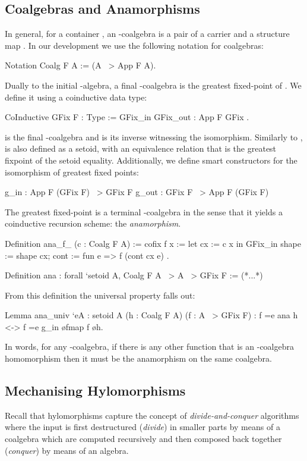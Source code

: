 \documentclass[a4paper,UKenglish,cleveref, autoref, thm-restate]{lipics-v2021}
\begin{document}
\subsection{Coalgebras and Anamorphisms}
\label{sec:coq-coalg}

In general, for a container , an -coalgebra is a pair of a carrier
 and a structure map .  In our development we use the
following notation for coalgebras:
\begin{coqcode}
Notation Coalg F A := (A ~> App F A).
\end{coqcode}
Dually to the initial -algebra, a final -coalgebra is the greatest
fixed-point of . We define it using a coinductive data type:
\begin{coqcode}
CoInductive GFix F : Type := GFix_in { GFix_out : App F GFix }.
\end{coqcode}
 is the final -coalgebra and  is its
inverse witnessing the isomorphism. Similarly to ,  is also
defined as a setoid, with an equivalence relation that is the greatest fixpoint
of the  setoid equality. Additionally, we define smart constructors
for the isomorphism of greatest fixed points:
\begin{coqcode}
g_in : App F (GFix F) ~> GFix F          g_out : GFix F ~> App F (GFix F)
\end{coqcode}
The greatest fixed-point is a terminal -coalgebra in the sense that it
yields a coinductive recursion scheme: the \emph{anamorphism}.
\begin{coqcode}
Definition ana_f_ (c : Coalg F A) :=
  cofix f x := let cx := c x in
   GFix_in { shape := shape cx; cont := fun e => f (cont cx e) }.

Definition ana : forall `{setoid A}, Coalg F A ~> A ~> GFix F := (*...*)
\end{coqcode}
From this definition the universal property falls out:
\begin{coqcode}
Lemma ana_univ `{eA : setoid A} (h : Coalg F A) (f : A ~> GFix F)
: f =e ana h <-> f =e g_in \o fmap f \o h.
\end{coqcode}
In words, for any -coalgebra, if there is any other function  that
is an -coalgebra homomorphism then it must be the anamorphism on the same
coalgebra.

\subsection{Mechanising Hylomorphisms}
\label{sec:coq-rec-coalgebras}
Recall that hylomorphisms capture the concept of \emph{divide-and-conquer}
algorithms where the input is first destructured (\emph{divide}) in smaller
parts by means of a coalgebra which are computed recursively and then composed
back together (\emph{conquer}) by means of an algebra.
\end{document}
